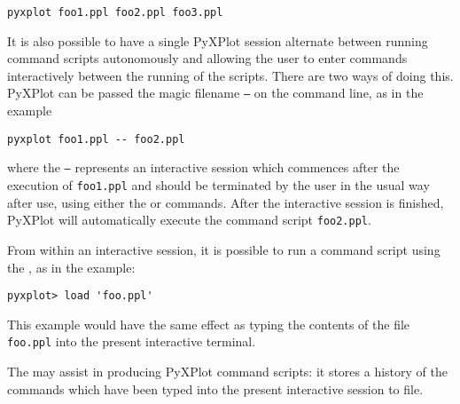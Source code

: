\begin{verbatim}
pyxplot foo1.ppl foo2.ppl foo3.ppl
\end{verbatim}

It is also possible to have a single PyXPlot session alternate between running
command scripts autonomously and allowing the user to enter commands
interactively between the running of the scripts. There are two ways of doing
this.  PyXPlot can be passed the magic filename {\tt --} on the command line,
as in the example

\begin{verbatim}
pyxplot foo1.ppl -- foo2.ppl
\end{verbatim}

\noindent where the {\tt --} represents an interactive session which
commences after the execution of {\tt foo1.ppl} and should be terminated by
the user in the usual way after use, using either the  or
 commands. After the interactive session is finished, PyXPlot
will automatically execute the command script {\tt foo2.ppl}.

From within an interactive session, it is possible to run a command script
using the , as in the example:

\begin{verbatim}
pyxplot> load 'foo.ppl'
\end{verbatim}

\noindent This example would have the same effect as typing the contents of the
file {\tt foo.ppl} into the present interactive terminal.

The  may assist in producing PyXPlot command scripts: it stores a
history of the commands which have been typed into the present interactive
session to file.


